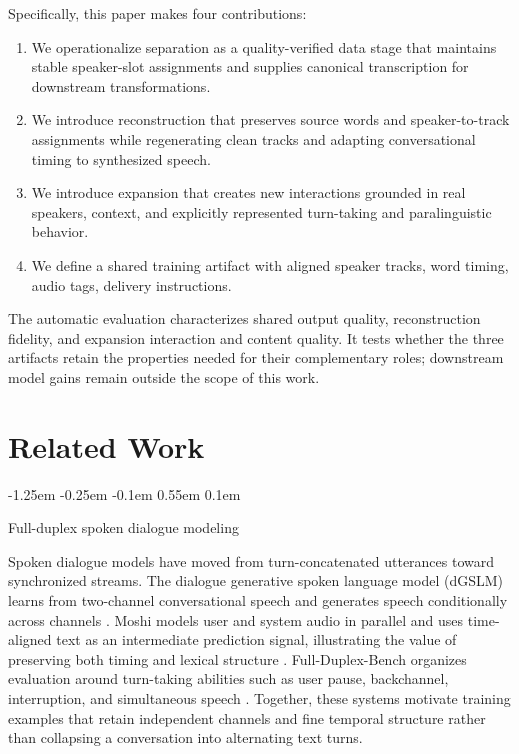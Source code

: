 \documentclass[10pt,twocolumn]{article}
\makeatletter
\renewcommand\subsection{%
  \@startsection{subsection}{2}{\z@}%
    {-1.25em \@plus -0.25em \@minus -0.1em}%
    {0.55em \@plus 0.1em}%
    {\normalfont\fontsize{10.5}{12.5}\selectfont\bfseries\raggedright
     \hyphenpenalty=10000\exhyphenpenalty=10000}}
\makeatother
\begin{document}
Specifically, this paper makes four contributions:
\begin{enumerate}
    \item We operationalize separation as a quality-verified data stage that maintains stable speaker-slot assignments and supplies canonical transcription for downstream transformations.
    \item We introduce reconstruction that preserves source words and speaker-to-track assignments while regenerating clean tracks and adapting conversational timing to synthesized speech.
    \item We introduce expansion that creates new interactions grounded in real speakers, context, and explicitly represented turn-taking and paralinguistic behavior.
    \item We define a shared training artifact with aligned speaker tracks, word timing, audio tags, delivery instructions.
\end{enumerate}

The automatic evaluation characterizes shared output quality, reconstruction fidelity, and expansion interaction and content quality. It tests whether the three artifacts retain the properties needed for their complementary roles; downstream model gains remain outside the scope of this work.

\section{Related Work}

\subsection{Full-duplex spoken dialogue modeling}

Spoken dialogue models have moved from turn-concatenated utterances toward synchronized streams. The dialogue generative spoken language model (dGSLM) learns from two-channel conversational speech and generates speech conditionally across channels \citep{nguyen2022dgslm}. Moshi models user and system audio in parallel and uses time-aligned text as an intermediate prediction signal, illustrating the value of preserving both timing and lexical structure \citep{defossez2024moshi}. Full-Duplex-Bench organizes evaluation around turn-taking abilities such as user pause, backchannel, interruption, and simultaneous speech \citep{lin2025fullbench}. Together, these systems motivate training examples that retain independent channels and fine temporal structure rather than collapsing a conversation into alternating text turns.
\end{document}
